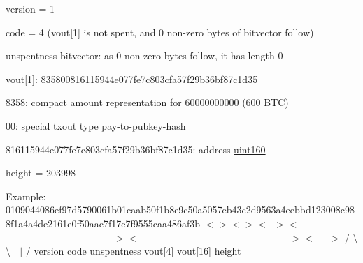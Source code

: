\begin{DoxyItemize}
\item version = 1
\item code = 4 (vout\mbox{[}1\mbox{]} is not spent, and 0 non-\/zero bytes of bitvector follow)
\item unspentness bitvector\+: as 0 non-\/zero bytes follow, it has length 0
\item vout\mbox{[}1\mbox{]}\+: 835800816115944e077fe7c803cfa57f29b36bf87c1d35
\begin{DoxyItemize}
\item 8358\+: compact amount representation for 60000000000 (600 B\+TC)
\item 00\+: special txout type pay-\/to-\/pubkey-\/hash
\item 816115944e077fe7c803cfa57f29b36bf87c1d35\+: address \mbox{\hyperlink{classuint160}{uint160}}
\end{DoxyItemize}
\item height = 203998
\end{DoxyItemize}

Example\+: 0109044086ef97d5790061b01caab50f1b8e9c50a5057eb43c2d9563a4eebbd123008c988f1a4a4de2161e0f50aac7f17e7f9555caa486af3b $<$$>$$<$$>$$<$--$>$$<$-\/-\/-\/-\/-\/-\/-\/-\/-\/-\/-\/-\/-\/-\/-\/-\/-\/-\/-\/-\/-\/-\/-\/-\/-\/-\/-\/-\/-\/-\/-\/-\/-\/-\/-\/-\/-\/-\/-\/-\/-\/-\/-\/-\/-\/-\/-\/---$>$$<$-\/-\/-\/-\/-\/-\/-\/-\/-\/-\/-\/-\/-\/-\/-\/-\/-\/-\/-\/-\/-\/-\/-\/-\/-\/-\/-\/-\/-\/-\/-\/-\/-\/-\/-\/-\/-\/-\/-\/-\/-\/-\/-\/---$>$$<$-\/---$>$ / \textbackslash{} \textbackslash{} $\vert$ $\vert$ / version code unspentness vout\mbox{[}4\mbox{]} vout\mbox{[}16\mbox{]} height


